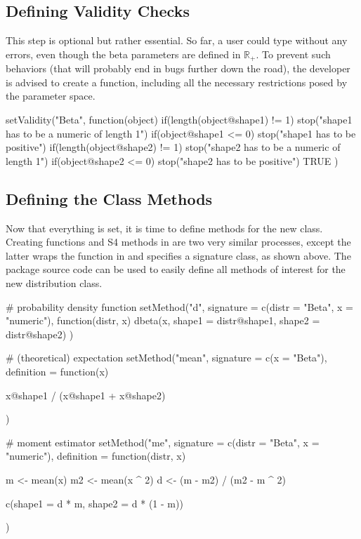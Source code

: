 \documentclass[nojss]{jss}
\newcommand{\fct}[1]{\code{#1()}}
\begin{document}
\subsection[Defining Validity Checks]{Defining Validity Checks}

This step is optional but rather essential. So far, a user could type  without any errors, even though the beta parameters are defined in $\mathbb{R}_{+}$. To prevent such behaviors (that will probably end in bugs further down the road), the developer is advised to create a \fct{setValidity} function, including all the necessary restrictions posed by the parameter space.

\begin{CodeChunk}
\begin{CodeInput}
setValidity("Beta", function(object) {
  if(length(object@shape1) != 1) {
    stop("shape1 has to be a numeric of length 1")
  }
  if(object@shape1 <= 0) {
    stop("shape1 has to be positive")
  }
  if(length(object@shape2) != 1) {
    stop("shape2 has to be a numeric of length 1")
  }
  if(object@shape2 <= 0) {
    stop("shape2 has to be positive")
  }
  TRUE
})
\end{CodeInput}
\end{CodeChunk}

\subsection[Defining the Class Methods]{Defining the Class Methods}

Now that everything is set, it is time to define methods for the new class. Creating functions and S4 methods in  are two very similar processes, except the latter wraps the function in \fct{setMethod} and specifies a signature class, as shown above. The package source code can be used to easily define all methods of interest for the new distribution class.

\begin{CodeChunk}
\begin{CodeInput}
# probability density function
setMethod("d", signature = c(distr = "Beta", x = "numeric"),
          function(distr, x) {
            dbeta(x, shape1 = distr@shape1, shape2 = distr@shape2)
          })

# (theoretical) expectation
setMethod("mean",
          signature  = c(x = "Beta"),
          definition = function(x) {

  x@shape1 / (x@shape1 + x@shape2)

})

# moment estimator
setMethod("me",
          signature  = c(distr = "Beta", x = "numeric"),
          definition = function(distr, x) {

  m  <- mean(x)
  m2 <- mean(x ^ 2)
  d  <- (m - m2) / (m2 - m ^ 2)

  c(shape1 = d * m, shape2 = d * (1 - m))

})
\end{CodeInput}
\end{CodeChunk}
\end{document}

